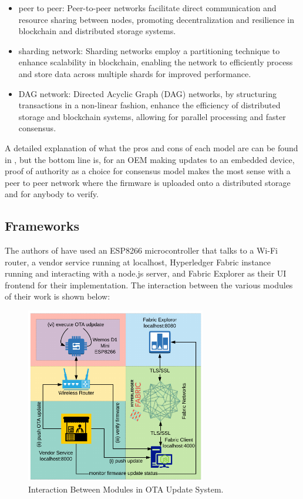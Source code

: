 \documentclass{article}
\begin{document}
\begin{itemize}
    \item peer to peer: Peer-to-peer networks facilitate direct communication and resource sharing between nodes, promoting decentralization and resilience in blockchain and distributed storage systems.
    \item sharding network: Sharding networks employ a partitioning technique to enhance scalability in blockchain, enabling the network to efficiently process and store data across multiple shards for improved performance.
    \item DAG network: Directed Acyclic Graph (DAG) networks, by structuring transactions in a non-linear fashion, enhance the efficiency of distributed storage and blockchain systems, allowing for parallel processing and faster consensus.
\end{itemize}

A detailed explanation of what the pros and cons of each model are can be found in \cite{adoption}, but the bottom line is, for an OEM making updates to an embedded device, proof of authority as a choice for consensus model makes the most sense with a peer to peer network where the firmware is uploaded onto a distributed storage and for anybody to verify.

\subsection{Frameworks}
The authors of \cite{otaupdate} have used an ESP8266 microcontroller that talks to a Wi-Fi router, a vendor service running at localhost, Hyperledger Fabric instance running and interacting with a node.js server, and Fabric Explorer as their UI frontend for their implementation. The interaction between the various modules of their work is shown below:
\begin{figure}[H]
    \centering
    \includegraphics[width=0.7\textwidth]{ota03.png}
    \caption{Interaction Between Modules in OTA Update System.\cite{otaupdate}}
\end{figure}
\end{document}
